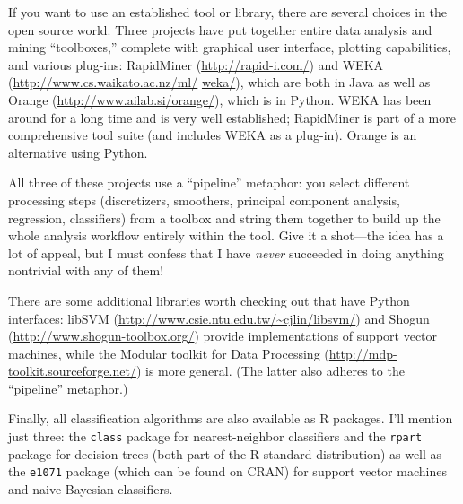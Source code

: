If you want to use an established tool or library, there are several
choices in the open source world. Three projects have put together
entire data analysis and mining ``toolboxes,'' complete with graphical
user interface, plotting capabilities, and various plug-ins:
RapidMiner (\url{http://rapid-i.com/}) and WEKA
(\url{http://www.cs.waikato.ac.nz/ml/} \url{weka/}), which are both in Java
as well as Orange (\url{http://www.ailab.si/orange/}), which is in
Python. WEKA has been around for a long time and is very well
established; RapidMiner is part of a more comprehensive tool suite
(and includes WEKA as a plug-in). Orange is an alternative using
Python.

All three of these projects use a ``pipeline'' metaphor: you select
different processing steps (discretizers, smoothers, principal
component analysis, regression, classifiers) from a toolbox and
string them together to build up the whole analysis workflow entirely
within the tool.  Give it a shot---the idea has a lot of appeal, but
I must confess that I have \emph{never} succeeded in doing anything
nontrivial with any of them!

There are some additional libraries worth checking out that have
Python interfaces: libSVM
(\url{http://www.csie.ntu.edu.tw/~cjlin/libsvm/}) and Shogun
(\url{http://www.shogun-toolbox}\break \url{.org/}) provide implementations of
support vector machines, while the Modular toolkit for Data Processing
(\url{http://mdp-toolkit.sourceforge.net/}) is more general. (The
latter also adheres to the ``pipeline'' metaphor.)

Finally, all classification algorithms are also available as R
packages. I'll mention just three: the \texttt{class} package for
nearest-neighbor classifiers and the \texttt{rpart} package for
decision trees (both part of the R standard distribution) as well as
the \texttt{e1071} package (which can be found on CRAN) for support
vector machines and naive Bayesian classifiers.



\vspace*{-6pt}
